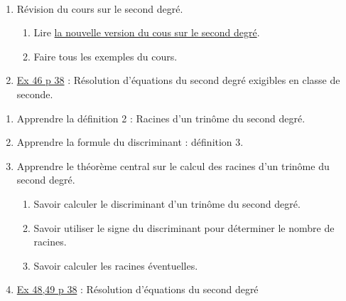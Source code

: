\documentclass[a4paper,11pt]{article}
\title{}
\author{}
\date{}
\theoremstyle{break}
\newcounter{numero}
\newcommand{\exo}{
  \addtocounter{numero}{1}%
  \textbf{\underline{Exercice \arabic{numero}:}}\quad}
\begin{document}
  \setlength{\unitlength}{1mm}
  \setlength\parindent{0mm}
  
  
  ~
  \medskip
  
  \begin{enumerate}
    \item Révision du cours sur le second degré.
    \begin{enumerate}
      \item Lire 
      \href{https://github.com/mathlorgues/math1sd1516/blob/master/Chapitres/Chapitre1/presentations/secondDegre.pdf}
      {la nouvelle version du cous sur le second degré}. 
      \item Faire tous les exemples du cours.
    \end{enumerate}
    \item  
    \href{https://github.com/mathlorgues/math1sd1516/blob/master/images/46p38.jpg}
    {Ex 46 p 38} : Résolution d'équations du second degré exigibles en classe de seconde.
   
  \end{enumerate}


  
  
   \begin{Dev}
    
    \begin{enumerate}
      
      \item Apprendre la définition 2 : Racines d'un trinôme du second degré.
      \item Apprendre la formule du discriminant : définition 3.
      \item Apprendre le théorème central sur le calcul des racines 
      d'un trinôme du second degré.
      \begin{enumerate}
	\item Savoir calculer le discriminant d'un trinôme du second degré. 
	\item Savoir utiliser le signe du discriminant pour déterminer
	le nombre de racines.
	\item Savoir calculer les racines éventuelles.
      \end{enumerate}
      \item  
      \href{https://github.com/mathlorgues/math1sd1516/blob/master/images/47-52p38.png}
      {Ex 48,49 p 38} : 
      Résolution d'équations du second degré
      
      
    \end{enumerate}
  \end{Dev}
  
  
  
  
\end{document}
